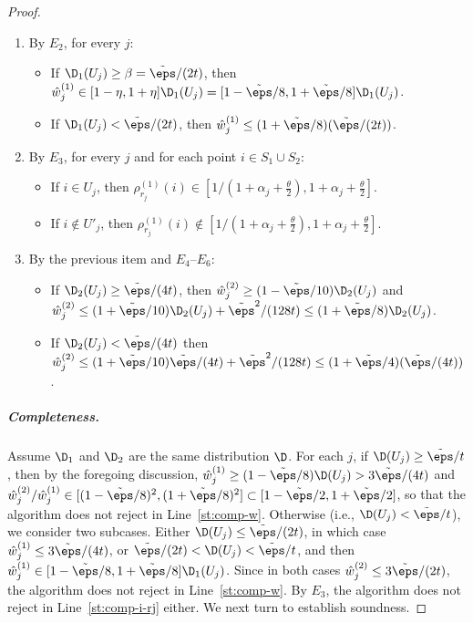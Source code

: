 \begin{proof}
\begin{enumerate}
\item By $E_2$, for every $j$:
  \begin{itemize}
  \item If $\D_1(U_j) \geq \beta = \tilde{\eps}/(2t)$,
  then
  $ \hat{w}_j^{(1)} \in [1-\eta,1+\eta]\D_1(U_j) =
     [1-\tilde{\eps}/8,1+\tilde{\eps}/8]\D_1(U_j)$.   \item If $\D_1(U_j) < \tilde{\eps}/(2t)$, then
  $\hat{w}_j^{(1)} \leq (1+\tilde{\eps}/8)(\tilde{\eps}/(2t))$.
  \end{itemize}
\item By $E_3$, for every $j$ and
for each point $i \in S_1\cup S_2$:
  \begin{itemize}
  \item If $i \in U_j$, then
  \mbox{$\rho_{r_j}^{(1)}(i) \in [1/(1+\alpha_j+\frac{\theta}{2}),1+\alpha_j+\frac{\theta}{2}]$}.
  \item If
  $i \notin U'_j$, then
  $\rho_{r_j}^{(1)}(i) \notin [1/(1+\alpha_j+\frac{\theta}{2}),1+\alpha_j+\frac{\theta}{2}]$.
  \end{itemize}
\item By the previous item and $E_4$--$E_6$:
 \begin{itemize}
 \item If
$\D_2(U_j) \geq \tilde{\eps}/(4t)$, then $\hat{w}^{(2)}_j\geq (1-\tilde{\eps}/10)\D_2(U_j)$
 and $\hat{w}^{(2)}_j \leq (1+\tilde{\eps}/10)\D_2(U_j) + \tilde{\eps}^2/({128} t)
      \leq (1+\tilde{\eps}/8)\D_2(U_j)$.
 \item If $\D_2(U_j) < \tilde{\eps}/(4t)$ then
  $\hat{w}^{(2)}_j \leq (1+\tilde{\eps}/10)\tilde{\eps}/(4t) + \tilde{\eps}^2/({128} t)
      \leq (1+\tilde{\eps}/4)(\tilde{\eps}/(4t))$.
  \end{itemize}
\end{enumerate}

\subparagraph{Completeness.}
Assume
$\D_1$ and $\D_2$ are the same distribution $\D$.
For each $j$, if $\D(U_j) \geq \tilde{\eps}/t$, then
by the foregoing discussion,
$\hat{w}^{(1)}_j \geq (1-\tilde{\eps}/8)\D(U_j) > 3\tilde{\eps}/(4t)$
and
$\hat{w}^{(2)}_j/\hat{w}^{(1)}_j \in [(1-\tilde{\eps}/8)^2,(1+\tilde{\eps}/8)^2]
 \subset [1-\tilde{\eps}/2,1+\tilde{\eps}/2]$,
so that the algorithm does not reject in Line~\ref{st:comp-w}. Otherwise (i.e., $\D(U_j) < \tilde{\eps}/t$), we consider two subcases.
Either \mbox{$\D(U_j) \leq \tilde{\eps}/(2t)$}, in which case
$\hat{w}^{(1)}_j \leq 3\tilde{\eps}/(4t)$, or \mbox{$\tilde{\eps}/(2t) < \D(U_j)< \tilde{\eps}/t$},
and then $\hat{w}^{(1)}_j\in [1-\tilde{\eps}/8,1+\tilde{\eps}/8]\D_1(U_j)$.
Since in both cases 
$\hat{w}^{(2)}_j \leq 3\tilde{\eps}/(2t)$,
the algorithm does not reject in Line~\ref{st:comp-w}.
By $E_3$, the algorithm does not reject in Line~\ref{st:comp-i-rj} either.
We next turn to establish soundness.


\end{proof}
